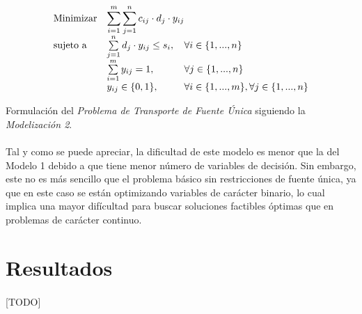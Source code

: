 \documentclass[a4paper, spanish]{article}
\begin{document}
      \begin{eqfloat}
        \begin{equation}
          \begin{array}{ll@{}ll}
            \text{Minimizar}	& \displaystyle \sum\limits_{i=1}^{m}\sum\limits_{j=1}^{n}c_{ij} \cdot d_{j} \cdot y_{ij} \\
            \text{sujeto a}		& \sum\limits_{j=1}^{n} d_{j} \cdot y_{ij}	\leq s_{i}, & \forall i \in \{1,...,n\}\\
                              &	\sum\limits_{i=1}^{m} y_{ij}	= 1, & \forall j \in \{1,...,n\} \\
                              & y_{ij}	\in \{0, 1\}, 	& \forall i \in \{1,...,m\}, \forall j \in \{1,...,n\}
          \end{array}
        \end{equation}
        \caption{Formulación del \emph{Problema de Transporte de Fuente Única} siguiendo la \emph{Modelización 2}.}
        \label{eq:single-source-transportation-model-2}
      \end{eqfloat}

      \paragraph{}
      Tal y como se puede apreciar, la dificultad de este modelo es menor que la del Modelo 1 debido a que tiene menor número de variables de decisión. Sin embargo, este no es más sencillo que el problema básico sin restricciones de fuente única, ya que en este caso se están optimizando variables de carácter binario, lo cual implica una mayor difícultad para buscar soluciones factibles óptimas que en problemas de carácter continuo.

  \section{Resultados}
  \label{sec:results}

    \paragraph{}
    [TODO]
\end{document}
